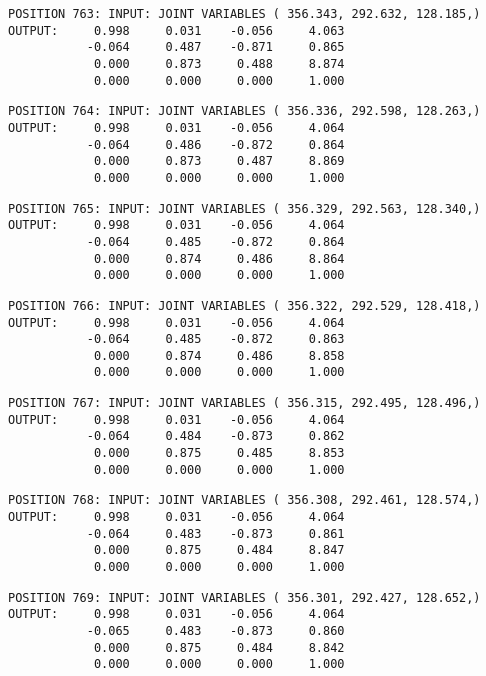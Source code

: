 \begin{verbatim}
POSITION 763: INPUT: JOINT VARIABLES ( 356.343, 292.632, 128.185,)
OUTPUT:     0.998     0.031    -0.056     4.063
           -0.064     0.487    -0.871     0.865
            0.000     0.873     0.488     8.874
            0.000     0.000     0.000     1.000
\end{verbatim} \pagebreak[1]\begin{verbatim}
POSITION 764: INPUT: JOINT VARIABLES ( 356.336, 292.598, 128.263,)
OUTPUT:     0.998     0.031    -0.056     4.064
           -0.064     0.486    -0.872     0.864
            0.000     0.873     0.487     8.869
            0.000     0.000     0.000     1.000
\end{verbatim} \pagebreak[1]\begin{verbatim}
POSITION 765: INPUT: JOINT VARIABLES ( 356.329, 292.563, 128.340,)
OUTPUT:     0.998     0.031    -0.056     4.064
           -0.064     0.485    -0.872     0.864
            0.000     0.874     0.486     8.864
            0.000     0.000     0.000     1.000
\end{verbatim} \pagebreak[1]\begin{verbatim}
POSITION 766: INPUT: JOINT VARIABLES ( 356.322, 292.529, 128.418,)
OUTPUT:     0.998     0.031    -0.056     4.064
           -0.064     0.485    -0.872     0.863
            0.000     0.874     0.486     8.858
            0.000     0.000     0.000     1.000
\end{verbatim} \pagebreak[1]\begin{verbatim}
POSITION 767: INPUT: JOINT VARIABLES ( 356.315, 292.495, 128.496,)
OUTPUT:     0.998     0.031    -0.056     4.064
           -0.064     0.484    -0.873     0.862
            0.000     0.875     0.485     8.853
            0.000     0.000     0.000     1.000
\end{verbatim} \pagebreak[1]\begin{verbatim}
POSITION 768: INPUT: JOINT VARIABLES ( 356.308, 292.461, 128.574,)
OUTPUT:     0.998     0.031    -0.056     4.064
           -0.064     0.483    -0.873     0.861
            0.000     0.875     0.484     8.847
            0.000     0.000     0.000     1.000
\end{verbatim} \pagebreak[1]\begin{verbatim}
POSITION 769: INPUT: JOINT VARIABLES ( 356.301, 292.427, 128.652,)
OUTPUT:     0.998     0.031    -0.056     4.064
           -0.065     0.483    -0.873     0.860
            0.000     0.875     0.484     8.842
            0.000     0.000     0.000     1.000
\end{verbatim} \pagebreak[1]\begin{verbatim}

\end{verbatim}
